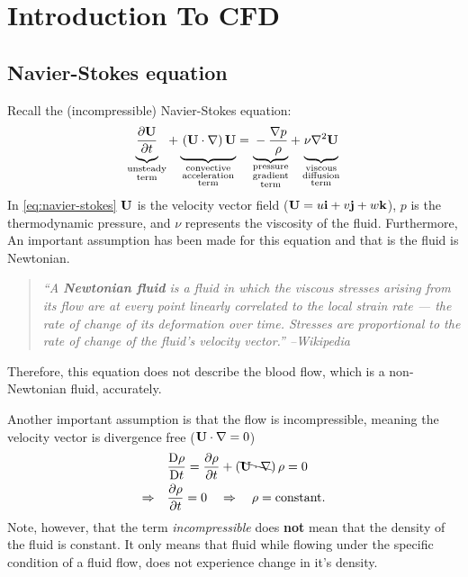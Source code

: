 \chapter{Introduction To CFD}

\section{Navier-Stokes equation}

Recall the (incompressible) Navier-Stokes equation:
%
\begin{equation}
  \underbrace{\vphantom{\f{}{\rho}}\f{\p \mb{U}}{\p t}}_{\substack{\text{unsteady} \\ \text{term}}}
  + \underbrace{\vphantom{\f{}{\rho}}\left(\mb{U} \cdot \nabla\right) \mb{U}}_{\substack{\text{convective} \\ \text{acceleration} \\ \text{term}}}
  =
  \underbrace{\vphantom{\f{}{\rho}}-\f{\nabla p}{\rho}}_{\substack{\text{pressure} \\ \text{gradient} \\ \text{term}}}
  + \underbrace{\vphantom{\f{}{\rho}}\nu \nabla^2 \mb{U}}_{\substack{\text{viscous} \\ \text{diffusion} \\ \text{term}}}
  \label{eq:navier-stokes}
\end{equation}
%
In \cref{eq:navier-stokes} \(\mathbf{U}\) is the velocity vector field (\(\mathbf{U} = u\mathbf{i} + v\mathbf{j} + w\mathbf{k}\)), \(p\) is the thermodynamic pressure, and \(\nu\) represents the viscosity of the fluid.
Furthermore, An important assumption has been made for this equation and that is the fluid is Newtonian.
%
\begin{quote}
  \itshape
  ``A \textbf{Newtonian fluid} is a fluid in which the viscous stresses arising from its flow are at every point linearly correlated to the local strain rate --- the rate of change of its deformation over time. Stresses are proportional to the rate of change of the fluid's velocity vector.'' --Wikipedia
\end{quote}
%
Therefore, this equation does not describe the blood flow, which is a non-Newtonian fluid, accurately.

Another important assumption is that the flow is incompressible, meaning the velocity vector is divergence free (\(\mathbf{U} \cdot \nabla = 0\))
%
\begin{equation}
\begin{aligned}
  &\frac{\mathop{}\!\mathrm{D} \rho}{\mathop{}\!\mathrm{D} t} = \frac{\partial \rho}{\partial t} + \left( \bcancel{\mathbf{U} \cdot \nabla} \right) \rho = 0 \\
  \Rightarrow \quad
  &\frac{\partial \rho}{\partial t} = 0 \quad \Rightarrow \quad \rho = \text{constant}.
\end{aligned}
  \label{eq:continuity-incompressible}
\end{equation}
Note, however, that the term \emph{incompressible} does \textbf{not} mean that the density of the fluid is constant.
It only means that fluid while flowing under the specific condition of a fluid flow, does not experience change in it's density.

